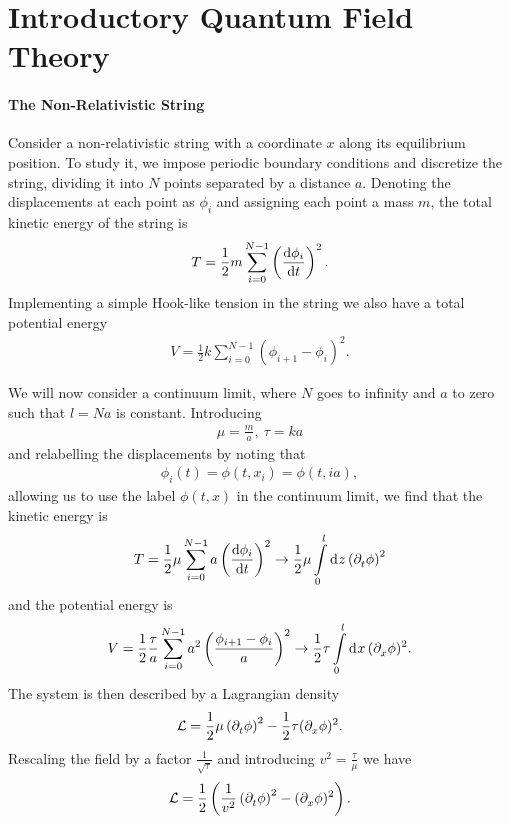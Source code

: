 \section{Introductory Quantum Field Theory}

\paragraph{The Non-Relativistic String}
Consider a non-relativistic string with a coordinate $x$ along its equilibrium position. To study it, we impose periodic boundary conditions and discretize the string, dividing it into $N$ points separated by a distance $a$. Denoting the displacements at each point as $\phi_{i}$ and assigning each point a mass $m$, the total kinetic energy of the string is
\begin{align*}
	T = \frac{1}{2}m\sum\limits_{i = 0}^{N - 1}\left(\dv{\phi_{i}}{t}\right)^{2}.
\end{align*}
Implementing a simple Hook-like tension in the string we also have a total potential energy
\begin{align*}
	V = \frac{1}{2}k\sum\limits_{i = 0}^{N - 1}\left(\phi_{i + 1} - \phi_{i}\right)^{2}.
\end{align*}

We will now consider a continuum limit, where $N$ goes to infinity and $a$ to zero such that $l = Na$ is constant. Introducing
\begin{align*}
	\mu = \frac{m}{a},\ \tau = ka
\end{align*}
and relabelling the displacements by noting that
\begin{align*}
	\phi_{i}(t) = \phi(t, x_{i}) = \phi(t, ia),
\end{align*}
allowing us to use the label $\phi(t, x)$ in the continuum limit, we find that the kinetic energy is
\begin{align*}
	T = \frac{1}{2}\mu\sum\limits_{i = 0}^{N - 1}a\left(\dv{\phi_{i}}{t}\right)^{2} \to \frac{1}{2}\mu\int\limits_{0}^{l}\dd[]{z}\left(\partial^{}_{t}\phi\right)^{2}
\end{align*}
and the potential energy is
\begin{align*}
	V = \frac{1}{2}\frac{\tau}{a}\sum\limits_{i = 0}^{N - 1}a^{2}\left(\frac{\phi_{i + 1} - \phi_{i}}{a}\right)^{2} \to \frac{1}{2}\tau\int\limits_{0}^{l}\dd[]{x}(\partial^{}_{x}\phi)^{2}.
\end{align*}
The system is then described by a Lagrangian density
\begin{align*}
	\mathcal{L} = \frac{1}{2}\mu\left(\partial^{}_{t}\phi\right)^{2} - \frac{1}{2}\tau(\partial^{}_{x}\phi)^{2}.
\end{align*}
Rescaling the field by a factor $\frac{1}{\sqrt{\tau}}$ and introducing $v^{2} = \frac{\tau}{\mu}$ we have
\begin{align*}
	\mathcal{L} = \frac{1}{2}\left(\frac{1}{v^{2}}\left(\partial^{}_{t}\phi\right)^{2} - (\partial^{}_{x}\phi)^{2}\right).
\end{align*}

